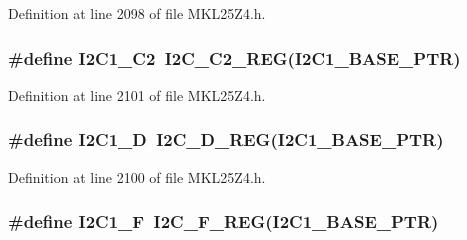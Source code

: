 Definition at line 2098 of file M\+K\+L25\+Z4.\+h.

\subsubsection[{\texorpdfstring{I2\+C1\+\_\+\+C2}{I2C1_C2}}]{\setlength{\rightskip}{0pt plus 5cm}\#define I2\+C1\+\_\+\+C2~{\bf I2\+C\+\_\+\+C2\+\_\+\+R\+EG}({\bf I2\+C1\+\_\+\+B\+A\+S\+E\+\_\+\+P\+TR})}\hypertarget{group___i2_c___register___accessor___macros_ga23604e2320135c1d7488c51e1b8257be}{}\label{group___i2_c___register___accessor___macros_ga23604e2320135c1d7488c51e1b8257be}


Definition at line 2101 of file M\+K\+L25\+Z4.\+h.

\subsubsection[{\texorpdfstring{I2\+C1\+\_\+D}{I2C1_D}}]{\setlength{\rightskip}{0pt plus 5cm}\#define I2\+C1\+\_\+D~{\bf I2\+C\+\_\+\+D\+\_\+\+R\+EG}({\bf I2\+C1\+\_\+\+B\+A\+S\+E\+\_\+\+P\+TR})}\hypertarget{group___i2_c___register___accessor___macros_ga014dafe97b03f68e829a75997094fe92}{}\label{group___i2_c___register___accessor___macros_ga014dafe97b03f68e829a75997094fe92}


Definition at line 2100 of file M\+K\+L25\+Z4.\+h.

\subsubsection[{\texorpdfstring{I2\+C1\+\_\+F}{I2C1_F}}]{\setlength{\rightskip}{0pt plus 5cm}\#define I2\+C1\+\_\+F~{\bf I2\+C\+\_\+\+F\+\_\+\+R\+EG}({\bf I2\+C1\+\_\+\+B\+A\+S\+E\+\_\+\+P\+TR})}\hypertarget{group___i2_c___register___accessor___macros_gaeb01706a855e5dbc5e864a0e18eeab36}{}\label{group___i2_c___register___accessor___macros_gaeb01706a855e5dbc5e864a0e18eeab36}


